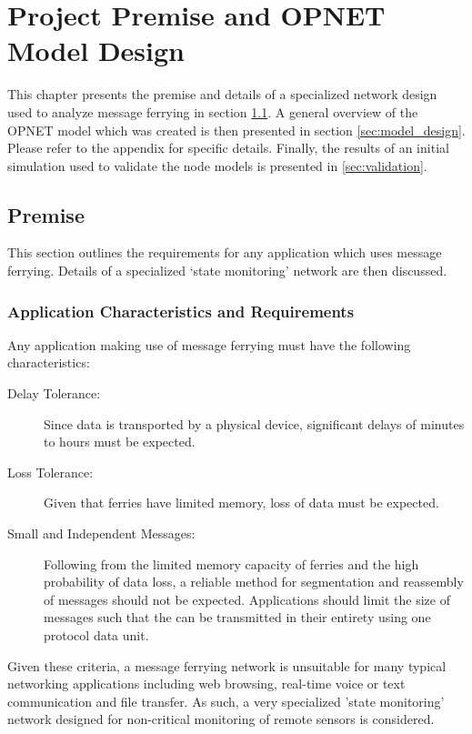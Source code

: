 \chapter{Project Premise and OPNET Model Design} 

This chapter presents the premise and details of a specialized network design used to analyze message ferrying in section \ref{sec:premise}.
A general overview of the OPNET model which was created is then presented in section \ref{sec:model_design}.
Please refer to the appendix for specific details.
Finally, the results of an initial simulation used to validate the node models is presented in \ref{sec:validation}.

\section{Premise}
\label{sec:premise}

This section outlines the requirements for any application which uses message ferrying.
Details of a specialized \lq{}state monitoring\rq{} network are then discussed.

\subsection{Application Characteristics and Requirements}
\label{sec:premise_appchar}

Any application making use of message ferrying must have the following characteristics:

\begin{description}
\item[Delay Tolerance: ]
Since data is transported by a physical device, significant delays of minutes to hours must be expected.
\item[Loss Tolerance: ]
Given that ferries have limited memory, loss of data must be expected.
\item[Small and Independent Messages: ]
Following from the limited memory capacity of ferries and the high probability of data loss, a reliable method for segmentation and reassembly of messages should not be expected. 
Applications should limit the size of messages such that the can be transmitted in their entirety using one protocol data unit.

\end{description}

Given these criteria, a message ferrying network is unsuitable for many typical networking applications including web browsing, real-time voice or text communication and file transfer.
As such, a very specialized 'state monitoring' network designed for non-critical monitoring of remote sensors is considered.

